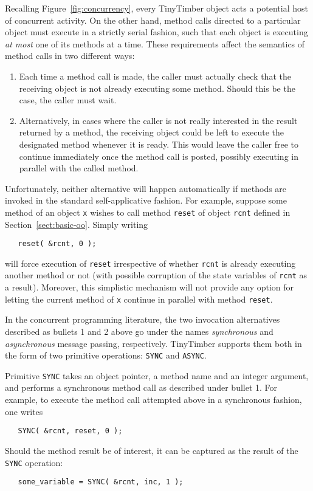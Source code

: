 \documentclass[12pt]{article}
\begin{document}
Recalling Figure~\ref{fig:concurrency}, every TinyTimber object acts a potential host of concurrent activity.  On the other hand, method calls directed to a particular object must execute in a strictly serial fashion, such that each object is executing {\em at most} one of its methods at a time.  These requirements affect the semantics of method calls in two different ways:
\begin{enumerate}
\item  Each time a method call is made, the caller must actually check that the receiving object is not already executing some method.  Should this be the case, the caller must wait.
\item  Alternatively, in cases where the caller is not really interested in the result returned by a method, the receiving object could be left to execute the designated method whenever it is ready.  This would leave the caller free to continue immediately once the method call is posted, possibly executing in parallel with the called method.
\end{enumerate}
Unfortunately, neither alternative will happen automatically if methods are invoked in the standard self-applicative fashion.  For example, suppose some method of an object {\tt x} wishes to call method {\tt reset} of object {\tt rcnt} defined in Section~\ref{sect:basic-oo}.  Simply writing
\begin{verbatim}
   reset( &rcnt, 0 );
\end{verbatim}
will force execution of {\tt reset} irrespective of whether {\tt rcnt} is already executing another method or not (with possible corruption of the state variables of {\tt rcnt} as a result).  Moreover, this simplistic mechanism will not provide any option for letting the current method of {\tt x} continue in parallel with method {\tt reset}.

In the concurrent programming literature, the two invocation alternatives described as bullets 1 and 2 above go under the names {\em synchronous} and {\em asynchronous} message passing, respectively.  TinyTimber supports them both in the form of two primitive operations: {\tt SYNC} and {\tt ASYNC}.

Primitive {\tt SYNC} takes an object pointer, a method name and an integer argument, and performs a synchronous method call as described under bullet 1.  For example, to execute the method call attempted above in a synchronous fashion, one writes
\begin{verbatim}
   SYNC( &rcnt, reset, 0 );
\end{verbatim}
Should the method result be of interest, it can be captured as the result of the {\tt SYNC} operation:
\begin{verbatim}
   some_variable = SYNC( &rcnt, inc, 1 );
\end{verbatim}
\end{document}
